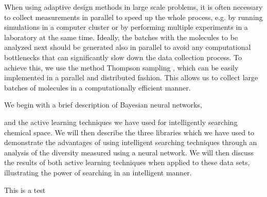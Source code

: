 When using adaptive design methods in large scale problems, it is often necessary to collect measurements in 
parallel to speed up the whole process, e.g. by running simulations in a computer cluster or by performing
multiple experiments in a laboratory at the same time. Ideally, the batches with the molecules to be analyzed next
should be generated also in parallel to avoid any computational bottlenecks that can significantly slow down the data collection process. To achieve this, we use the method Thompson sampling \cite{thompson_likelihood_1933}, which can be easily implemented
in a parallel and distributed fashion. This allows us to collect large batches of molecules in a computationally efficient manner.

We begin with a brief description of Bayesian neural networks,

and the active learning techniques we have used for intelligently searching chemical  space.  We will then describe the three libraries which we have used to demonstrate the advantages of using intelligent searching techniques through an analysis of the diversity measured using a neural network.  We will then  discuss the results of both active learning techniques when applied to these data sets, illustrating the power of searching in an intelligent manner.

This is a test
